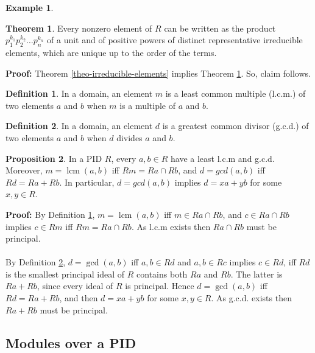 \documentclass[11pt]{amsbook}%
\theoremstyle{plain}
\theoremstyle{definition}
\newtheorem{definition*}{Definition}
\newtheorem*{example*}{Example}
\newtheorem{proposition}[theorem]{Proposition}
\newtheorem{theorem}{Theorem}
\numberwithin{equation}{section}
\renewcommand{\proof}{ \textbf{Proof: }}
\DeclareMathOperator{\lcm}{lcm}
\DeclareMathOperator{\gcd}{gcd}
\begin{document}
\begin{example*}
\begin{theorem}
  \label{theo-representative-irreducible}
  Every nonzero element of $R$ can be written as the product $p_{1}^{k_{1}} p_{2}^{k_{2}} \dots p_{n}^{k_{n}}$
  of a unit and of positive powers of distinct representative irreducible
  elements, which are unique up to the order of the terms.
\end{theorem} \vspace{1.8em}
\proof Theorem \ref{theo-irreducible-elements} implies Theorem \ref{theo-representative-irreducible}.
So, claim follows. \qedsymbol

\begin{definition*}
  \label{def-lcm}
  In a domain, an element $m$ is a least common multiple (l.c.m.) of two elements $a$ and $b$
  when $m$ is a multiple of $a$ and $b$.
\end{definition*}

\begin{definition*}
  \label{def-gcd}
  In a domain, an element $d$ is a greatest common divisor (g.c.d.) of two elements $a$ and $b$
  when $d$ divides $a$ and $b$.
\end{definition*}

\begin{proposition}
  In a PID $R$, every $a, b \in R$ have a least l.c.m and g.c.d. Moreover, $m = \lcm(a, b)$
  iff $Rm = Ra \cap Rb$, and $d = gcd(a, b)$ iff $Rd = Ra + Rb$. In particular,
  $d = gcd(a, b)$ implies $d = xa + yb$ for some $x, y \in R$.
\end{proposition} \vspace{1.8em}
\proof By Definition \ref{def-lcm}, $m = \lcm(a, b)$ iff $m \in Ra \cap Rb$, and $c \in Ra \cap Rb$ 
implies $c \in Rm$ iff $Rm = Ra \cap Rb$. As l.c.m exists then $Ra \cap Rb$ must be principal. \\ \\
By Definition \ref{def-gcd}, $d = \gcd(a, b)$ iff $a, b \in Rd$ and $a, b \in Rc$ implies
$c \in Rd$, iff $Rd$ is the smallest principal ideal of $R$ contains both $Ra$ and $Rb$.
The latter is $Ra + Rb$, since every ideal of $R$ is principal. Hence $d = \gcd(a, b)$
iff $Rd = Ra + Rb$, and then $d = xa + yb$ for some $x, y \in R$. As g.c.d. exists
then $Ra + Rb$ must be principal. \qedsymbol

\subsection{Modules over a PID}
\label{subsect-modules-over-pid}


\end{example*}
\end{document}
